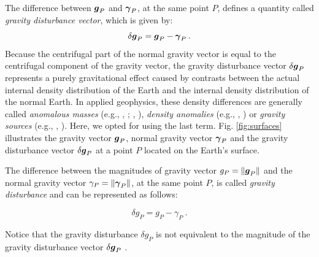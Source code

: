 \documentclass[extra]{gji}
\begin{document}
The difference between $\mitbf{g}_{P}$ and $\mitbf{\gamma}_{P}$, at the same 
point $P$, defines a quantity called \textit{gravity disturbance 
vector}, which is given by:
\begin{equation}
\delta \mitbf{g}_{P} = 
\mitbf{g}_{P} - \mitbf{\gamma}_{P} \: .
\label{eq:gravity-disturbance-vector}
\end{equation}
Because the centrifugal part of the normal gravity vector 
is equal to the centrifugal component of the gravity vector, 
the gravity disturbance vector $\delta \mitbf{g}_{P}$ represents 
a purely gravitational effect caused by contrasts between the actual internal 
density distribution of the Earth and the internal density 
distribution of the normal Earth.
In applied geophysics, these density differences are generally 
called \textit{anomalous masses} (e.g., \citeauthor{hammer1945}, 
\citeyear{hammer1945}; \citeauthor{lafehr1965}, \citeyear{lafehr1965}),
\textit{density anomalies} (e.g., \citeauthor{forsberg1984}, 
\citeyear{forsberg1984}) or \textit{gravity sources} (e.g., 
\citeauthor{blakely1996}, \citeyear{blakely1996}). Here, we opted for 
using the last term.
Fig. \ref{fig:surfaces} illustrates the gravity vector 
$\mitbf{g}_{P}$, normal gravity vector $\mitbf{\gamma}_{P}$ and 
the gravity disturbance vector $\delta \mitbf{g}_{P}$ at a point $P$ 
located on the Earth's surface.

The difference between the magnitudes of gravity vector
$g_{P} = \| \mitbf{g}_{P} \|$ and the normal gravity vector
$\gamma_{P} = \| \mitbf{\gamma}_{P} \|$, at the 
same point $P$, is called \textit{gravity disturbance} 
\citep{heiskanen-moritz1967, hofmann-wellenhof-moritz2005} 
and can be represented as follows:

\begin{equation}
\delta g_{P} = g_{P} - \gamma_{P} \: .
\label{eq:gravity-disturbance}
\end{equation}

Notice that the gravity disturbance $\delta g_{P}$ is not equivalent 
to the magnitude of the gravity disturbance vector 
$\delta \mitbf{g}_{P}$ \citep{barthelmes2013, sanso_sideris2013}.
\end{document}
